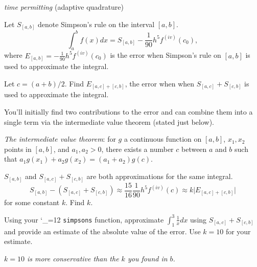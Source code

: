 \documentclass[12pt,letterpaper,noanswers]{exam}
\makeatletter
\newcommand{\pyf}{%
  \begingroup\catcode`_=12
  \pyf@
}
\newcommand{\pyf@}[1]{\texttt{#1}\endgroup}
\makeatother
\begin{document}
\begin{questions}

\item \emph{time permitting} (adaptive quadrature) %


Let $S_{[a,b]}$ denote Simpson's rule on the interval $[a,b]$.  \[\displaystyle\int_a^b f(x)dx = S_{[a,b]}-\frac{1}{90}h^5f^{(iv)}(c_0),\] where $E_{[a,b]}=-\frac{1}{90}h^5f^{(iv)}(c_0)$ is the error when Simpson's rule on $[a,b]$ is used to approximate the integral.

\begin{parts}
\item Let $c = (a+b)/2$.  Find $E_{[a,c]+[c,b]}$, the error when when $S_{[a,c]} + S_{[c,b]}$ is used to approximate the integral.

You'll initially find two contributions to the error and can combine them into a single term via the intermediate value theorem (stated just below).

\emph{The intermediate value theorem}: for $g$ a continuous function on $[a,b]$, $x_1, x_2$ points in $[a,b]$, and $a_1, a_2>0$, there exists a number $c$ between $a$ and $b$ such that $a_1g(x_1) + a_2g(x_2) = (a_1+a_2)g(c)$.


\item $S_{[a,b]}$ and $S_{[a,c]}+S_{[c,b]}$ are both approximations for the same integral.  \[S_{[a,b]}-\left(S_{[a,c]}+S_{[c,b]}\right) \approx \frac{15}{16}\frac{1}{90}h^5f^{(iv)}(c) \approx k\vert E_{[a,c]+[c,b]}\vert\] for some constant $k$.  Find $k$.


\item Using your \pyf{simpsons} function, approximate $\displaystyle\int_1^3 \frac{1}{x} dx$ using $S_{[a,c]}+S_{[c,b]}$ and provide an estimate of the absolute value of the error.  Use $k = 10$ for your estimate.  


\emph{$k=10$ is more conservative than the $k$ you found in $b$.}


\end{parts}
\end{questions}
\end{document}
